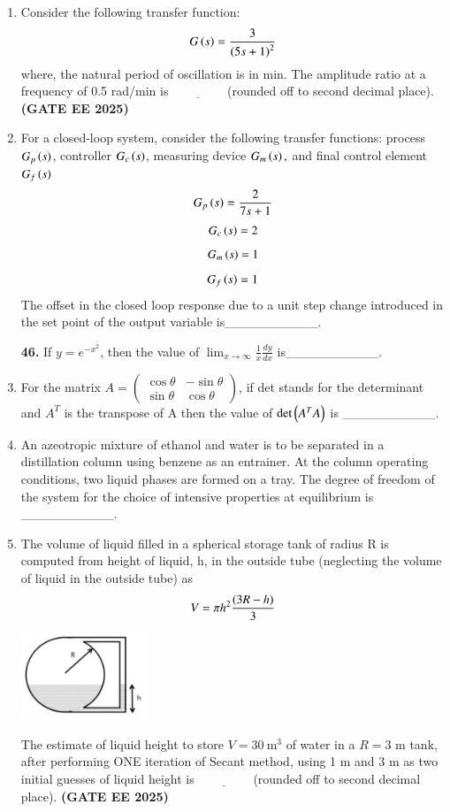\documentclass[journal,12pt,onecolumn]{IEEEtran}
\theoremstyle{remark}
\begin{document}
\begin{enumerate}
\item Consider the following transfer function:
\[ G\left(s\right)=\frac{3}{\left(5s+1\right)^{2}} \]
where, the natural period of oscillation is in min. The amplitude ratio at a frequency of 0.5 rad/min is$\underline{\hspace{2cm}}$(rounded off to second decimal place). \hfill \textbf{(GATE EE 2025)} 



\item For a closed-loop system, consider the following transfer functions:
process $G_{p}\left(s\right)$, controller $G_{c}\left(s\right)$, measuring device $G_{m}\left(s\right),$ and final control element $G_{f}\left(s\right)$
\[ G_{p}\left(s\right) = \frac{2}{7s+1} \]
\[ G_{c}\left(s\right)=2 \]
\[ G_{m}\left(s\right)=1 \]
\[ G_{f}\left(s\right)=1 \]
The offset in the closed loop response due to a unit step change introduced in the set point of the output variable is\_\_\_\_\_\_\_\_\_\_.




\noindent\textbf{46.} If $y=e^{-x^{2}}$, then the value of $\lim_{x\rightarrow\infty}\frac{1}{x}\frac{dy}{dx}$ is\_\_\_\_\_\_\_\_\_\_.



\item For the matrix $A = \begin{pmatrix} \cos\theta & -\sin\theta \\ \sin\theta & \cos\theta \end{pmatrix}$, if det stands for the determinant and $A^{T}$ is the transpose of A then the value of $\det\left(A^{T}A\right)$ is \_\_\_\_\_\_\_\_\_\_.



\item An azeotropic mixture of ethanol and water is to be separated in a distillation column using benzene as an entrainer. At the column operating conditions, two liquid phases are formed on a tray. The degree of freedom of the system for the choice of intensive properties at equilibrium is \_\_\_\_\_\_\_\_\_\_.




\item The volume of liquid filled in a spherical storage tank of radius R is computed from height of liquid, h, in the outside tube (neglecting the volume of liquid in the outside tube) as
\[ V=\pi h^{2}\frac{\left(3R-h\right)}{3} \]
\begin{center}
\includegraphics[width=0.3\textwidth]{figs/49.png}
\end{center}
The estimate of liquid height  to store $V=30~\text{m}^{3}$ of water in a $R=3$ m tank, after performing ONE iteration of Secant method, using 1 m and 3 m as two initial guesses of liquid height is$\underline{\hspace{2cm}}$(rounded off to second decimal place). \hfill \textbf{(GATE EE 2025)} 




\end{enumerate}
\end{document}
